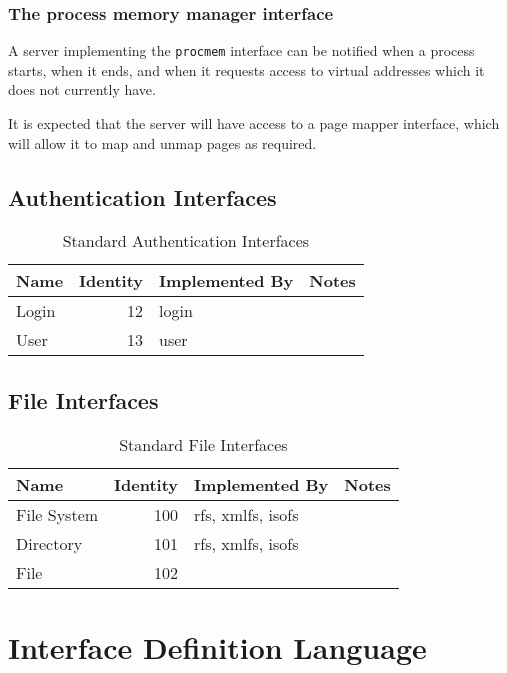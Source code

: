 \subsubsection{The process memory manager interface}

A server implementing the {\tt procmem} interface can be notified when a process starts, when it ends, and when it requests access to virtual addresses which it does not currently have.

It is expected that the server will have access to a page mapper interface, which will allow it to map and unmap pages as required.

\subsection{Authentication Interfaces}

\begin{table}[ht]
\begin{tabular}{l r l l}
\hline\hline
Name & Identity & Implemented By & Notes \\ [0.5ex]
\hline
Login           & 12 & login & \\
User            & 13 & user & \\
\hline %
\end{tabular}
\caption{Standard Authentication Interfaces} %
\label{table:auth_interfaces}
\end{table}

\subsection{File Interfaces}

\begin{table}[ht]
\begin{tabular}{l r l l}
\hline\hline
Name & Identity & Implemented By & Notes \\ [0.5ex]
\hline

File System           & 100 & rfs, xmlfs, isofs & \\
Directory             & 101 & rfs, xmlfs, isofs & \\
File                  & 102 &  & \\
\hline %
\end{tabular}
\caption{Standard File Interfaces} %
\label{table:file_interfaces}
\end{table}


\section{Interface Definition Language}

